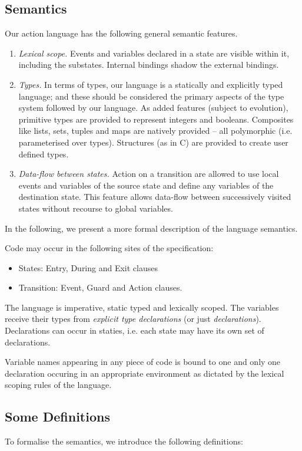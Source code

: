 \documentclass[12pt,a4paper]{report}
\begin{document}
\subsection{Semantics}
Our action language has the following general semantic features.
\begin{enumerate}
	\item \emph{Lexical scope.} Events and variables declared in a state are visible within it, including the substates. Internal bindings shadow the external bindings.
	\item \emph{Types.} In terms of types, our language is a statically and explicitly typed language; and these should be considered the primary aspects of the type system followed by our language. As added features (subject to evolution), primitive types are provided to represent integers and booleans. Composites like lists, sets, tuples and maps are natively provided -- all polymorphic (i.e. parameterised over types). Structures (as in C) are provided to create user defined types.  
	\item \emph{Data-flow between states.} Action on a transition are allowed to use local events and variables of the source state and define any variables of the destination state. This feature allows data-flow between successively visited states without recourse to global variables.
\end{enumerate}

In the following, we present a more formal description of the language semantics.

Code may occur in the following sites of the specification:
\begin{itemize}
	\item States: Entry, During and Exit clauses
	\item Transition: Event, Guard and Action clauses.
\end{itemize}

The language is imperative, static typed and lexically scoped. The variables receive their types from \emph{explicit type declarations} (or just \emph{declarations}). Declarations can occur in staties, i.e. each state may have its own set of declarations.

Variable names appearing in any piece of code is bound to one and only one declaration occuring in an appropriate environment as dictated by the lexical scoping rules of the language.

\subsection{Some Definitions}
To formalise the semantics, we introduce the following definitions:
\end{document}
